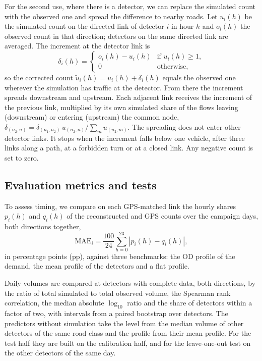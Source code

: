 \documentclass[preprint,11pt,a4paper]{elsarticle}
\begin{document}
For the second use, where there is a detector, we can replace the simulated count with the observed one and spread the difference to nearby roads. Let $u_i(h)$ be the simulated count on the directed link of detector $i$ in hour $h$ and $o_i(h)$ the observed count in that direction; detectors on the same directed link are averaged. The increment at the detector link is
\begin{equation}
\delta_i(h)=\begin{cases} o_i(h)-u_i(h) & \text{if } u_i(h)\ge 1,\\ 0 & \text{otherwise,}\end{cases}
\label{eq:coil_residual}
\end{equation}
so the corrected count $\widetilde u_i(h)=u_i(h)+\delta_i(h)$ equals the observed one wherever the simulation has traffic at the detector. From there the increment spreads downstream and upstream. Each adjacent link receives the increment of the previous link, multiplied by its own simulated share of the flows leaving (downstream) or entering (upstream) the common node, $\delta_{(n_2,n)}=\delta_{(n_1,n_2)}\,u_{(n_2,n)}/\sum_m u_{(n_2,m)}$. The spreading does not enter other detector links. It stops when the increment falls below one vehicle, after three links along a path, at a forbidden turn or at a closed link. Any negative count is set to zero.

\subsection{Evaluation metrics and tests}
\label{sec:assessment_methods}
To assess timing, we compare on each GPS-matched link the hourly shares $p_i(h)$ and $q_i(h)$ of the reconstructed and GPS counts over the campaign days, both directions together,
\begin{equation}
\mathrm{MAE}_i=\frac{100}{24}\sum_{h=0}^{23}|p_i(h)-q_i(h)|,
\label{eq:profile_error}
\end{equation}
in percentage points (pp), against three benchmarks: the OD profile of the demand, the mean profile of the detectors and a flat profile.

Daily volumes are compared at detectors with complete data, both directions, by the ratio of total simulated to total observed volume, the Spearman rank correlation, the median absolute $\log_{10}$ ratio and the share of detectors within a factor of two, with intervals from a paired bootstrap over detectors. The predictors without simulation take the level from the median volume of other detectors of the same road class and the profile from their mean profile. For the test half they are built on the calibration half, and for the leave-one-out test on the other detectors of the same day.
\end{document}
